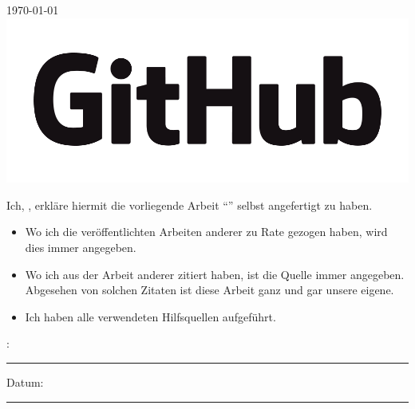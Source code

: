 \documentclass[
11pt, %
oneside, %
ngerman, %
singlespacing, %
headsepline, %
chapterinoneline, %
]{MastersDoctoralThesis} %
\begin{document}
\begin{titlepage}
\begin{center}
  \vfill

  \vfill

  {\large \today}\\[3cm] %
  \includegraphics[width=0.60\columnwidth]{Figures/University_Logo}

  \vfill
 \end{center}
\end{titlepage}


\begin{declaration}
 \addchaptertocentry{\authorshipname} %
 \noindent Ich, \authorname, erkläre hiermit die vorliegende Arbeit \enquote{\ttitle} selbst angefertigt zu haben.

 \begin{itemize}
  \item Wo ich die veröffentlichten Arbeiten anderer zu Rate gezogen haben, wird dies immer angegeben.
  \item Wo ich aus der Arbeit anderer zitiert haben, ist die Quelle immer angegeben. Abgesehen von solchen Zitaten ist diese Arbeit ganz und gar unsere eigene.
  \item Ich haben alle verwendeten Hilfsquellen aufgeführt.\\
 \end{itemize}


 \noindent \authorname:\\
 \rule[0.5em]{25em}{0.5pt} %

 \noindent Datum:\\
 \rule[0.5em]{25em}{0.5pt} %
 \\
 \\

\end{declaration}

\cleardoublepage

\end{document}

